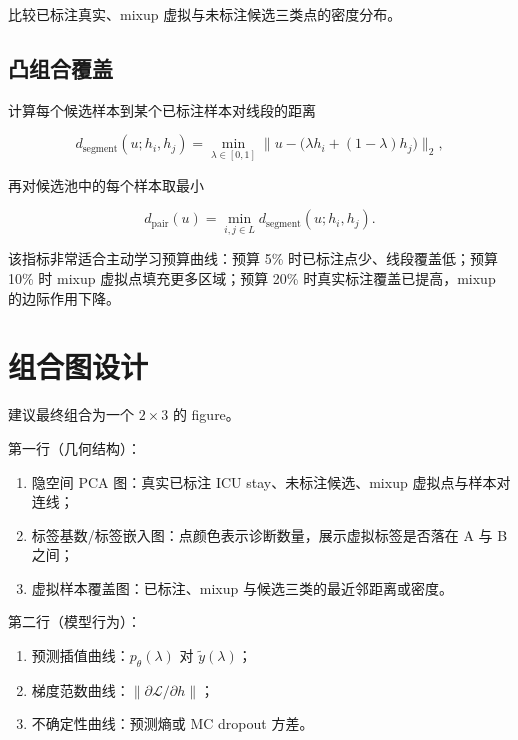 \documentclass[11pt,a4paper]{article}
\theoremstyle{definition}
\begin{document}
比较已标注真实、mixup 虚拟与未标注候选三类点的密度分布。

\subsection{凸组合覆盖}

计算每个候选样本到某个已标注样本对线段的距离

\begin{equation}
  d_{\text{segment}}(u;h_i,h_j)=\min_{\lambda\in[0,1]}
  \bigl\lVert u-\bigl(\lambda h_i+(1-\lambda)h_j\bigr)\bigr\rVert_2,
  \label{eq:segment-dist}
\end{equation}

再对候选池中的每个样本取最小

\begin{equation}
  d_{\text{pair}}(u)=\min_{i,j\in L}d_{\text{segment}}(u;h_i,h_j).
  \label{eq:pair-dist}
\end{equation}

该指标非常适合主动学习预算曲线：预算 5\% 时已标注点少、线段覆盖低；预算 10\% 时
mixup 虚拟点填充更多区域；预算 20\% 时真实标注覆盖已提高，mixup 的边际作用下降。

\section{组合图设计}
\label{sec:composite}

建议最终组合为一个 $2\times3$ 的 figure。

第一行（几何结构）：
\begin{enumerate}[itemsep=1pt]
  \item[(a)] 隐空间 PCA 图：真实已标注 ICU stay、未标注候选、mixup 虚拟点与样本对
        连线；
  \item[(b)] 标签基数/标签嵌入图：点颜色表示诊断数量，展示虚拟标签是否落在 A 与 B
        之间；
  \item[(c)] 虚拟样本覆盖图：已标注、mixup 与候选三类的最近邻距离或密度。
\end{enumerate}

第二行（模型行为）：
\begin{enumerate}[itemsep=1pt]
  \item[(d)] 预测插值曲线：$p_\theta(\lambda)$ 对 $\tilde{y}(\lambda)$；
  \item[(e)] 梯度范数曲线：$\lVert\partial\mathcal{L}/\partial h\rVert$；
  \item[(f)] 不确定性曲线：预测熵或 MC dropout 方差。
\end{enumerate}
\end{document}
